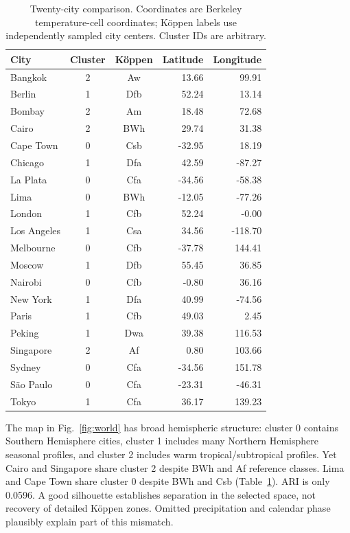 \documentclass[conference]{IEEEtran}
\begin{document}
\begin{table}[t]\caption{Twenty-city comparison. Coordinates are Berkeley temperature-cell coordinates; K\"oppen labels use independently sampled city centers. Cluster IDs are arbitrary.}\label{tab:koppen}\centering\scriptsize
\begin{tabular}{lccrr}\toprule City & Cluster & K\"oppen & Latitude & Longitude \\\midrule

Bangkok & 2 & Aw & 13.66 & 99.91 \\
Berlin & 1 & Dfb & 52.24 & 13.14 \\
Bombay & 2 & Am & 18.48 & 72.68 \\
Cairo & 2 & BWh & 29.74 & 31.38 \\
Cape Town & 0 & Csb & -32.95 & 18.19 \\
Chicago & 1 & Dfa & 42.59 & -87.27 \\
La Plata & 0 & Cfa & -34.56 & -58.38 \\
Lima & 0 & BWh & -12.05 & -77.26 \\
London & 1 & Cfb & 52.24 & -0.00 \\
Los Angeles & 1 & Csa & 34.56 & -118.70 \\
Melbourne & 0 & Cfb & -37.78 & 144.41 \\
Moscow & 1 & Dfb & 55.45 & 36.85 \\
Nairobi & 0 & Cfb & -0.80 & 36.16 \\
New York & 1 & Dfa & 40.99 & -74.56 \\
Paris & 1 & Cfb & 49.03 & 2.45 \\
Peking & 1 & Dwa & 39.38 & 116.53 \\
Singapore & 2 & Af & 0.80 & 103.66 \\
Sydney & 0 & Cfa & -34.56 & 151.78 \\
S\~ao Paulo & 0 & Cfa & -23.31 & -46.31 \\
Tokyo & 1 & Cfa & 36.17 & 139.23 \\

\bottomrule\end{tabular}\end{table}
The map in Fig.~\ref{fig:world} has broad hemispheric structure: cluster 0 contains Southern Hemisphere cities, cluster 1 includes many Northern Hemisphere seasonal profiles, and cluster 2 includes warm tropical/subtropical profiles. Yet Cairo and Singapore share cluster 2 despite BWh and Af reference classes. Lima and Cape Town share cluster 0 despite BWh and Csb (Table~\ref{tab:koppen}). ARI is only 0.0596. A good silhouette establishes separation in the selected space, not recovery of detailed K\"oppen zones. Omitted precipitation and calendar phase plausibly explain part of this mismatch.
\end{document}
